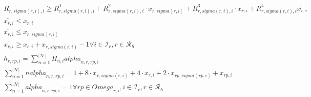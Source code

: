 \begin{align}
  & R_{r , \mathit{sigma} \left(r , i\right) , i} \geq R_{r , \mathit{sigma} \left(r , i\right) , i}^{1} + R_{r , \mathit{sigma} \left(r , i\right) , i}^{2} \cdot x_{r , \mathit{sigma} \left(r , i\right)} + R_{r , \mathit{sigma} \left(r , i\right) , i}^{3} \cdot x_{r , i} + R_{r , \mathit{sigma} \left(r , i\right) , i}^{4} \tilde{x_{r , i}} \tag{eq\_0032\_a} \\
  & \tilde{x_{r , i}} \leq x_{r , i} \tag{eq\_0032\_b} \\
  & \tilde{x_{r , i}} \leq x_{r , \mathit{sigma} \left(r , i\right)} \tag{eq\_0032\_c} \\
  & \tilde{x_{r , i}} \geq x_{r , i} + x_{r , \mathit{sigma} \left(r , i\right)} - 1 \forall i \in \mathcal{I}_{r} , r \in \mathcal{R}_{h} \tag{eq\_0032\_d} \\
  & h_{r , rp , i} = \sum_{n = 1}^{\left|\mathcal{N}\right|} H_{n , i} \mathit{alpha}_{n , r , rp , i} \tag{eq\_0033\_a} \\
  & \sum_{n = 1}^{\left|\mathcal{N}\right|} n \mathit{alpha}_{n , r , rp , i} = 1 + 8 \cdot x_{r , \mathit{sigma} \left(r , i\right)} + 4 \cdot x_{r , i} + 2 \cdot x_{rp , \mathit{sigma} \left(rp , i\right)} + x_{rp , i} \tag{eq\_0033\_b} \\
  & \sum_{n = 1}^{\left|\mathcal{N}\right|} \mathit{alpha}_{n , r , rp , i} = 1 \forall rp \in \mathit{Omega}_{r , i} , i \in \mathcal{I}_{r} , r \in \mathcal{R}_{h} \tag{eq\_0033\_c} \\
\end{align}
